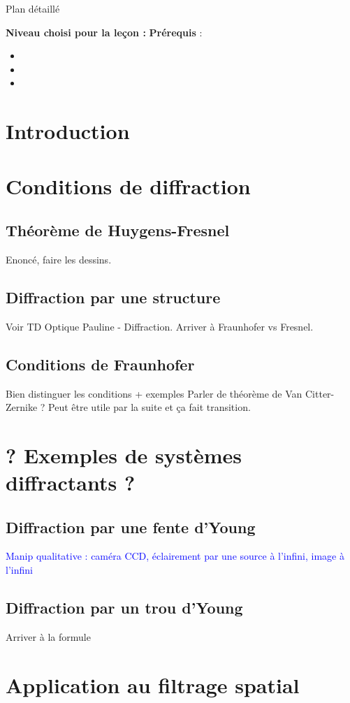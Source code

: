 \begin{reportBlock}{Plan détaillé}

  \textbf{Niveau choisi pour la leçon :} 
  \newline
  \textbf{Prérequis} : \begin{itemize}
      \item 
      \item 
      \item 
  \end{itemize}
  
  \section*{Introduction}

  \section{Conditions de diffraction}

  \subsection{Théorème de Huygens-Fresnel} 
  Enoncé, faire les dessins.
  \subsection{Diffraction par une structure}
  Voir TD Optique Pauline - Diffraction. Arriver à Fraunhofer vs Fresnel. 

  \subsection{Conditions de Fraunhofer}
  Bien distinguer les conditions + exemples
  Parler de théorème de Van Citter-Zernike ? Peut être utile par la suite et ça fait transition.
  \section{? Exemples de systèmes diffractants ?}
  
  \subsection{Diffraction par une fente d'Young}
  \textcolor{blue}{Manip qualitative : caméra CCD, éclairement par une source à l'infini, image à l'infini }

  \subsection{Diffraction par un trou d'Young}
  Arriver à la formule
  
  \section{Application au filtrage spatial}

  \subsection{}


\end{reportBlock}